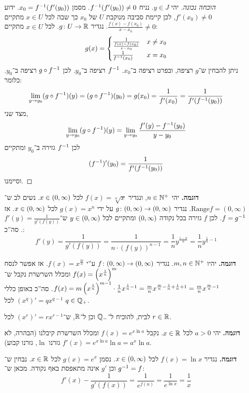 \documentclass[name=רשימות חשבון דיפרנציאלי ואינטגרלי 1א]{../../../tex/classes/megasumPreamble}
\begin{document}
	\begin{proof}[הוכחה נכונה]
		יהי $y \in J$. נניח $f^{-1}(f'(y_0)) \neq 0$. מסמן $x_0 = f^{-1}(f'(y_0))$. ידוע $f'(x_0) \neq 0$, לכן קיימת סביבה מנוקבת $U$ של $x_0$ כך שבה לכל $x \in U$ מתקיים $\frac{f(x) - f(x_0)}{x - x_0} \neq 0$. נגדיר $g \colon U \to \mathbb{R}$. לכל $x \in U$ מתקיים:
		\[ g(x) = \begin{cases}
			\frac{1}{\frac{f(x) - f(x_0)}{x - x_0}} & x \neq x_0 \\
			\frac{1}{f^{-1}(x_0)} & x = x_0
		\end{cases} \]
		ניתן להבחין ש־$g$ רציפה, ובפרט רציפה ב־$x_0$. $f^{-1}$ רציפה ב־$y_0$. לכן $g \circ f^{-1}$ רציפה ב־$y_0$. כלומר:
		\[ \lim_{y \to y_0} (g \circ f^{-1})(y) = (g \circ f^{-1})(y_0) = g(x_0) = \frac{1}{f'(x_0)} = \frac{1}{f'(f^{-1}(y_0))} \]
		מצד שני,
		\[ \lim_{y \to y_0} (g \circ f^{-1})(y) = \lim_{ y \to y_0} \frac{f'(y) - f^{-1}(y_0)}{y - y_0} \]
		לכן $f^{-1}$ גזירה ב־$y_0$ ומתקיים
		\[ (f^{-1})'(y_0) = \frac{1}{f'(f^{-1}(y_0))} \]
		וסיימנו.
	\end{proof}
	\textbf{דוגמה. }יהי $n \in \mathbb{N}^{+}$, ונגדיר $f(x) = \sqrt[n]{x}$ לכל $x \in (0, \infty)$. נשים לב ש־$\mathrm{Range} f = (0, \infty)$. נגדיר $g \colon (0, \infty) \to (0, \infty)$ על ידי $g(x) = x^{n}$ לכל $x \in (0, \infty)$. אז $f = g^{-1}$. לכן $f$ גזירה בכל נקודה $(0, \infty)$ ומתקיים לכל $y \in (0, \infty)$ ש־$f'(y) = \frac{1}{g'(f(y))}$. סה''כ:
	\[ f'(y) = \frac{1}{g'(f(y))} = \frac{1}{n \cdot (f(y))^{n - 1}} = \frac{1}{n}y^{\frac{1 - n}{n}} = \frac{1}{n}y^{\frac{1}{n} - 1} \]

	\textbf{דוגמה. }יהיו $m, n \in \mathbb{N}^{+}$. נגדיר $f \colon (0, \infty) \to (0, \infty)$ ע''י $f(x) = x^{\frac{m}{n}}$. אז אפשר לנסח $f(x) = \left ( x^{\frac{1}{n}} \right )^{m}$ ומכלל השרשרת נקבל ש־$f(x) = m\left ( x^{\frac{1}{n}} \right )^{m - 1} \cdot \frac{1}{n}x^{\frac{1}{n} - 1} = \frac{m}{n}x^{\frac{m}{n} - \frac{1}{n} + \frac{1}{n} + 1} = \frac{m}{n}x^{\frac{m}{n} - 1}$.
	סה''כ באופן כללי $(x^{q})' = qx^{q - 1}$ לכל $q \in \mathbb{Q}_+$.

	לבית, להוכיח ל־$\mathbb{Q}_-$ וכן ל־$\mathbb{R}$, ש־$(x^{r})' =  rx^{r - 1}$ לכל $r \in \mathbb{R}$.

	\textbf{דוגמה. }יהי $a > 0$ לכל $x \in \mathbb{R}$. נקבל $f(x) = e^{x\ln a}$ ומכלל השרשרת קיבלנו (הבהרה, לא גזרנו $\ln$, גזרנו קבוע) $f'(x) = e^{x\ln a} \ln a = a^{x}\ln a$.

	\textbf{דוגמה. }נגדיר $f(x) = \ln x$ לכל $x \in (0, \infty)$. נסמן $g(x) = e^{x}$ לכל $x \in \mathbb{R}$. נבחין ש־$g^{-1} = f$ וכן $g'$ אינה מתאפסת באף נקודה. מכאן ש־:
	\[ f'(x) - \frac{1}{g'(f(x))} = \frac{1}{e^{f(n)}} = \frac{1}{e^{\ln x}} = \frac{1}{x} \]
\end{document}
